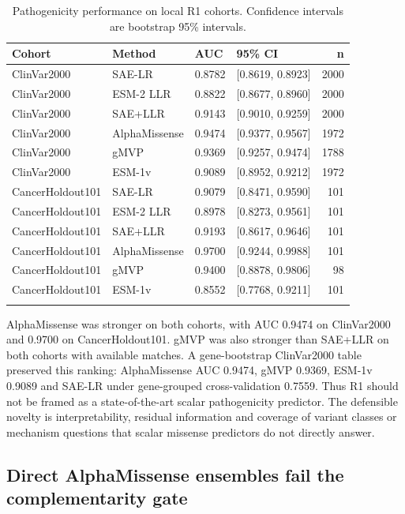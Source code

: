 \documentclass[pdflatex,sn-nature]{sn-jnl}
\begin{document}
\begin{table}[h]
\caption{Pathogenicity performance on local R1 cohorts. Confidence intervals are bootstrap 95\% intervals.}\label{tab:pathogenicity}
\begin{tabular}{@{}llllr@{}}
\toprule
Cohort & Method & AUC & 95\% CI & n \\
\midrule
ClinVar2000 & SAE-LR & 0.8782 & [0.8619, 0.8923] & 2000 \\
ClinVar2000 & ESM-2 LLR & 0.8822 & [0.8677, 0.8960] & 2000 \\
ClinVar2000 & SAE+LLR & 0.9143 & [0.9010, 0.9259] & 2000 \\
ClinVar2000 & AlphaMissense & 0.9474 & [0.9377, 0.9567] & 1972 \\
ClinVar2000 & gMVP & 0.9369 & [0.9257, 0.9474] & 1788 \\
ClinVar2000 & ESM-1v & 0.9089 & [0.8952, 0.9212] & 1972 \\
CancerHoldout101 & SAE-LR & 0.9079 & [0.8471, 0.9590] & 101 \\
CancerHoldout101 & ESM-2 LLR & 0.8978 & [0.8273, 0.9561] & 101 \\
CancerHoldout101 & SAE+LLR & 0.9193 & [0.8617, 0.9646] & 101 \\
CancerHoldout101 & AlphaMissense & 0.9700 & [0.9244, 0.9988] & 101 \\
CancerHoldout101 & gMVP & 0.9400 & [0.8878, 0.9806] & 98 \\
CancerHoldout101 & ESM-1v & 0.8552 & [0.7768, 0.9211] & 101 \\
\botrule
\end{tabular}
\end{table}

AlphaMissense was stronger on both cohorts, with AUC 0.9474 on ClinVar2000 and 0.9700 on CancerHoldout101. gMVP was also stronger than SAE+LLR on both cohorts with available matches. A gene-bootstrap ClinVar2000 table preserved this ranking: AlphaMissense AUC 0.9474, gMVP 0.9369, ESM-1v 0.9089 and SAE-LR under gene-grouped cross-validation 0.7559. Thus R1 should not be framed as a state-of-the-art scalar pathogenicity predictor. The defensible novelty is interpretability, residual information and coverage of variant classes or mechanism questions that scalar missense predictors do not directly answer.

\subsection{Direct AlphaMissense ensembles fail the complementarity gate}
\end{document}
